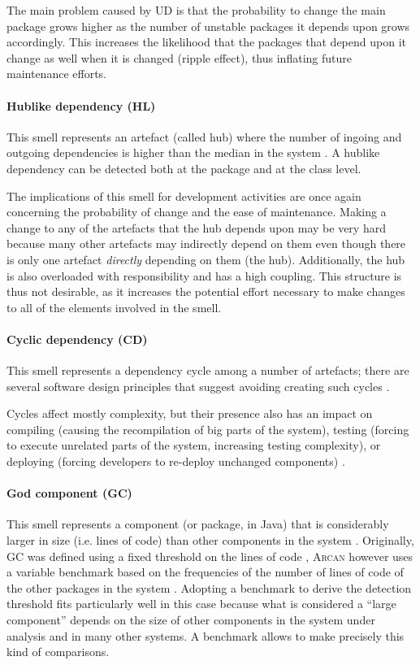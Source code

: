 The main problem caused by UD is that the probability to change the main package grows higher as the number of unstable packages it depends upon grows accordingly. This increases the likelihood that the packages that depend upon it change as well when it is changed (ripple effect), thus inflating future maintenance efforts.

\paragraph{Hublike dependency (HL)}\label{c6:sec:arch-smells-hl}
This smell represents an artefact (called hub) where the number of ingoing and outgoing dependencies is higher than the median in the system \cite{Arcelli2016}. A hublike dependency can be detected both at the package and at the class level.

The implications of this smell for development activities are once again concerning the probability of change and the ease of maintenance.
Making a change to any of the artefacts that the hub depends upon may be very hard \cite{Martin2018} because many other artefacts may indirectly depend on them even though there is only one artefact \emph{directly} depending on them (the hub).
Additionally, the hub is also overloaded with responsibility and has a high coupling.
This structure is thus not desirable, as it increases the potential effort necessary to make changes to all of the elements involved in the smell.

\paragraph{Cyclic dependency (CD)}\label{c6:sec:arch-smells-cd}
This smell represents a dependency cycle among a number of artefacts; there are several software design principles that suggest avoiding creating such cycles \cite{Lippert2006,Parnas1979,Stevens1974,Martin2018}.

Cycles affect mostly complexity, but their presence also has an impact on compiling (causing the recompilation of big parts of the system), testing (forcing to execute unrelated parts of the system, increasing testing complexity), or deploying (forcing developers to re-deploy unchanged components) \cite{Lippert2006}.

\paragraph{God component (GC)}\label{c6:sec:arch-smells-gc}
This smell represents a component (or package, in Java) that is considerably larger in size (i.e. lines of code) than other components in the system \cite{Lippert2006}.
Originally, GC was defined using a fixed threshold on the lines of code \cite{Lippert2006}, \textsc{Arcan} however uses a variable benchmark based on the frequencies of the number of lines of code of the other packages in the system \cite{Arcelli2015}.
Adopting a benchmark to derive the detection threshold fits particularly well in this case because what is considered a ``large component'' depends on the size of other components in the system under analysis and in many other systems.
A benchmark allows to make precisely this kind of comparisons.


